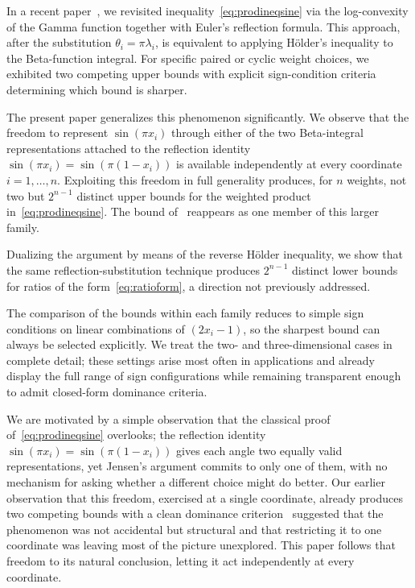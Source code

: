 \documentclass[12pt]{amsart}
\theoremstyle{definition}
\begin{document}
In a recent paper~\cite{MSW2026}, we revisited inequality~\eqref{eq:prodineqsine} via the log-convexity of the Gamma function together with Euler's reflection formula. This approach, after the substitution $\theta_i=\pi\lambda_i$, is equivalent to applying H\"older's inequality to the Beta-function integral. For specific paired or cyclic weight choices, we exhibited two competing upper bounds with explicit sign-condition criteria determining which bound is sharper.

The present paper generalizes this phenomenon significantly. We observe that the freedom to represent $\sin(\pi x_i)$ through either of the two Beta-integral representations attached to the reflection identity $\sin(\pi x_i)=\sin(\pi(1-x_i))$ is available independently at every coordinate $i=1,\dots,n$. Exploiting this freedom in full generality produces, for $n$ weights, not two but $2^{n-1}$ distinct upper bounds for the weighted product in~\eqref{eq:prodineqsine}. The bound of~\cite{MSW2026} reappears as one member of this larger family.

Dualizing the argument by means of the reverse H\"older inequality, we show that the same reflection-substitution technique produces $2^{n-1}$ distinct lower bounds for ratios of the form~\eqref{eq:ratioform}, a direction not previously addressed.

The comparison of the bounds within each family reduces to simple sign conditions on linear combinations of $(2x_i-1)$, so the sharpest bound can always be selected explicitly. We treat the two- and three-dimensional cases in complete detail; these settings arise most often in applications and already display the full range of sign configurations while remaining transparent enough to admit closed-form dominance criteria.


We are motivated by a simple observation that the classical proof of~\eqref{eq:prodineqsine} overlooks; the reflection identity $\sin(\pi x_i)=\sin(\pi(1-x_i))$ gives each angle two equally valid representations, yet Jensen's argument commits to only one of them, with no mechanism for asking whether a different choice might do better. Our earlier observation that this freedom, exercised at a single coordinate, already produces two competing bounds with a clean dominance criterion~\cite{MSW2026} suggested that the phenomenon was not accidental but structural and that restricting it to one coordinate was leaving most of the picture unexplored. This paper follows that freedom to its natural conclusion, letting it act independently at every coordinate.
\end{document}
